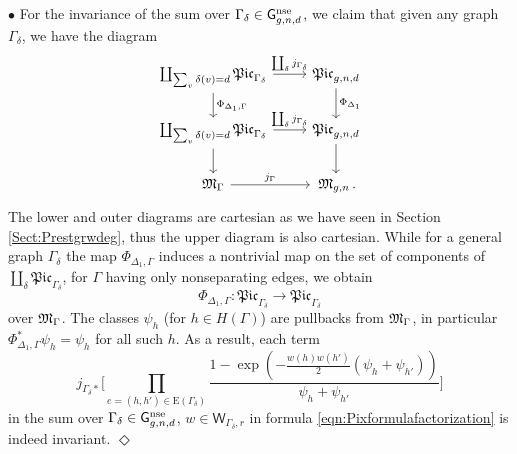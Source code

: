 \documentclass[a4paper,12pt]{article} %
\def\qed{{\hfill $\Diamond$}}
\def\Aut{{\rm Aut}}
\def\E{\mathrm{E}}
\def\V{\mathrm{V}}
\def\G{\mathsf{G}}
\theoremstyle{definition}
\theoremstyle{plain}%
\newcommand{\Picabs}{\mathfrak{Pic}}
\begin{document}
\noindent $\bullet$ 
For the invariance of the sum over $\Gamma_\delta\in \G_{g,n,d}^\textup{nse}$, we claim that given any graph $\Gamma_\delta$, we have the diagram
\begin{equation}
\begin{tikzcd}
\coprod_{\sum_v \delta(v)=d} \Picabs_{\Gamma_\delta} \arrow[r, "\coprod_{\delta} j_{\Gamma_\delta}"] \arrow[d, "\Phi_{\Delta_1,\Gamma}"] &\Picabs_{g,n,d} \arrow[d, "\Phi_{\Delta_1}"]\\
\coprod_{\sum_v \delta(v)=d} \Picabs_{\Gamma_\delta} \arrow[r, "\coprod_{\delta} j_{\Gamma_\delta}"] \arrow[d] &\Picabs_{g,n,d} \arrow[d]\\
\frak M_\Gamma \arrow[r,"j_\Gamma"] & \, \frak M_{g,n}\, .
\end{tikzcd}
\end{equation}
The lower and outer diagrams are cartesian as we have seen in Section \ref{Sect:Prestgrwdeg}, thus the upper diagram is also cartesian. While for a general graph $\Gamma_\delta$ the map $\Phi_{\Delta_1,\Gamma}$ induces a nontrivial map on the set of components of $\coprod_{\delta} \Picabs_{\Gamma_\delta}$, for $\Gamma$ having only nonseparating edges, we obtain  $$\Phi_{\Delta_1, \Gamma} : \Picabs_{\Gamma_\delta} \to \Picabs_{\Gamma_\delta}$$ over $\frak M_{\Gamma}$. 
The classes $\psi_h$ (for $h \in H(\Gamma)$) are pullbacks from $\frak M_\Gamma$, in particular $\Phi_{\Delta_1,\Gamma}^* \psi_h = \psi_h$ for all such $h$.
As a result, each term
\[
j_{\Gamma_\delta*}\Bigg[
\prod_{e=(h,h')\in \E(\Gamma_\delta)}
\frac{1-\exp\left(-\frac{w(h)w(h')}2(\psi_h+\psi_{h'})\right)}{\psi_h + \psi_{h'}} \Bigg]
\]
in the sum over $\Gamma_\delta\in \G_{g,n,d}^\textup{nse}$, $w\in \mathsf{W}_{\Gamma_\delta,r}$ in formula 
\eqref{eqn:Pixformulafactorization}
is indeed invariant. \qed

\end{document}
